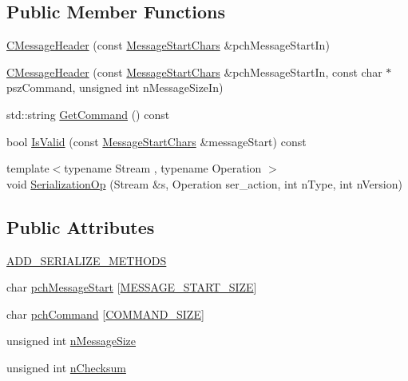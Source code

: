 \subsection*{Public Member Functions}
\begin{DoxyCompactItemize}
\item 
\mbox{\hyperlink{class_c_message_header_af2b7b2dbd21363099e3da99699d93d59}{C\+Message\+Header}} (const \mbox{\hyperlink{class_c_message_header_a0d0eeb540cbf4087973f6652ad61878f}{Message\+Start\+Chars}} \&pch\+Message\+Start\+In)
\item 
\mbox{\hyperlink{class_c_message_header_a169f178657c1e3621f16adeeae44bc3a}{C\+Message\+Header}} (const \mbox{\hyperlink{class_c_message_header_a0d0eeb540cbf4087973f6652ad61878f}{Message\+Start\+Chars}} \&pch\+Message\+Start\+In, const char $\ast$psz\+Command, unsigned int n\+Message\+Size\+In)
\item 
std\+::string \mbox{\hyperlink{class_c_message_header_ab5b3807481d4b918527b86523f1efee2}{Get\+Command}} () const
\item 
bool \mbox{\hyperlink{class_c_message_header_a759db7100358ba4a44bf6dee757ffe51}{Is\+Valid}} (const \mbox{\hyperlink{class_c_message_header_a0d0eeb540cbf4087973f6652ad61878f}{Message\+Start\+Chars}} \&message\+Start) const
\item 
{\footnotesize template$<$typename Stream , typename Operation $>$ }\\void \mbox{\hyperlink{class_c_message_header_a3881923a93297c3a7a8e413ab3730408}{Serialization\+Op}} (Stream \&s, Operation ser\+\_\+action, int n\+Type, int n\+Version)
\end{DoxyCompactItemize}
\subsection*{Public Attributes}
\begin{DoxyCompactItemize}
\item 
\mbox{\hyperlink{class_c_message_header_a447044c3fbf9d5e98dcc4121ac808d2f}{A\+D\+D\+\_\+\+S\+E\+R\+I\+A\+L\+I\+Z\+E\+\_\+\+M\+E\+T\+H\+O\+DS}}
\item 
char \mbox{\hyperlink{class_c_message_header_a4284bf1d2fd792af89e1c93b7e6e274e}{pch\+Message\+Start}} \mbox{[}\mbox{\hyperlink{protocol_8h_a6bcadada595cc3da13e6a04be1715917}{M\+E\+S\+S\+A\+G\+E\+\_\+\+S\+T\+A\+R\+T\+\_\+\+S\+I\+ZE}}\mbox{]}
\item 
char \mbox{\hyperlink{class_c_message_header_a87d62b0d9afb3889f318991700a34431}{pch\+Command}} \mbox{[}\mbox{\hyperlink{class_c_message_header_a44037297cb6e6b432e2386c351ce05dda8c1bfc0fa6a63c8b73abef30555a5e54}{C\+O\+M\+M\+A\+N\+D\+\_\+\+S\+I\+ZE}}\mbox{]}
\item 
unsigned int \mbox{\hyperlink{class_c_message_header_a67ccb9f1f23af69e309a8d6c8bfff751}{n\+Message\+Size}}
\item 
unsigned int \mbox{\hyperlink{class_c_message_header_ab9c6bec3694e2c110b4f358af9e55984}{n\+Checksum}}
\end{DoxyCompactItemize}


